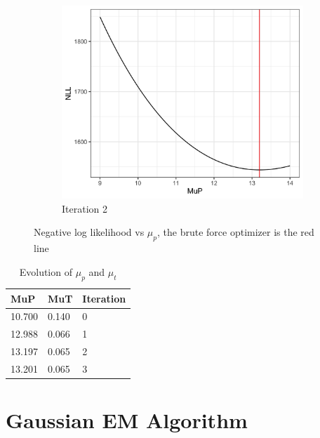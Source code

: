 \documentclass[11pt]{article}
\begin{document}
\begin{figure}[H]
\begin{subfigure}[b]{0.45\textwidth}
        \end{subfigure}
        \begin{subfigure}[b]{0.45\textwidth}

          \includegraphics[width=\textwidth]{../../../output/figures/Optimization/opt_data_3.png}
          \caption{Iteration 2}

        \end{subfigure}
        \caption{Negative log likelihood vs $\mu_p$, the brute force optimizer is the red line}
        \label{fig-nll}
    \end{figure}

    \begin{table}[H]
    \centering
      \caption{Evolution of $\mu_p$ and $\mu_t$}
      \label{tab:my-table}
      \begin{tabular}{|l|l|l|}
      \hline
      \textbf{MuP} & \textbf{MuT} & \textbf{Iteration} \\ \hline
      10.700       & 0.140        & 0                  \\ \hline
      12.988       & 0.066        & 1                  \\ \hline
      13.197       & 0.065        & 2                  \\ \hline
      13.201       & 0.065        & 3                  \\ \hline
      \end{tabular}
    \end{table}

\section{Gaussian EM Algorithm}
\end{document}
